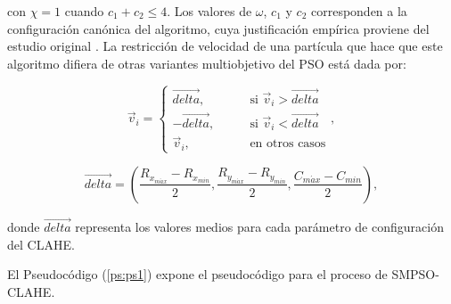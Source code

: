 \documentclass[sigplan,screen]{acmart}
\begin{document}
\noindent con $\chi=1$ cuando $c_1+c_2\leq 4$. Los valores de $\omega$, $c_1$ y $c_2$ corresponden a la configuración canónica del algoritmo, cuya justificación empírica proviene del estudio original \cite{Nebro2009}. La restricción de velocidad de una partícula que hace que este algoritmo difiera de otras variantes multiobjetivo del PSO está dada por:

\begin{equation}
    \vec{v}_i=
    \begin{cases}
        \overrightarrow{delta},\qquad &\text{si } \vec{v}_i>\overrightarrow{delta}\\
        -\overrightarrow{delta},\qquad &\text{si } \vec{v}_i<\overrightarrow{delta}\\
        \vec{v}_i,\qquad &\text{en otros casos}
    \end{cases},
\label{eq:eq6}
\end{equation}

\begin{equation*}
    \overrightarrow{delta}=\left(\frac{R_{x_{m\acute{a}x}}-R_{x_{min}}}{2},\frac{R_{y_{m\acute{a}x}}-R_{y_{min}}}{2},\frac{C_{m\acute{a}x}-C_{min}}{2}\right),
\end{equation*}

\noindent donde $\overrightarrow{delta}$ representa los valores medios para cada parámetro de configuración del CLAHE.\par

El Pseudocódigo (\ref{ps:ps1}) expone el pseudocódigo para el proceso de SMPSO-CLAHE.
\end{document}
